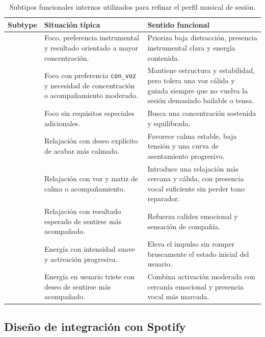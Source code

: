 \begin{table}[H]
\centering
\small
\renewcommand{\arraystretch}{1.12}
\begin{tabularx}{\textwidth}{|P{2.9cm}|P{4.1cm}|Y|}
\hline
\textbf{Subtype} & \textbf{Situación típica} & \textbf{Sentido funcional} \\
\hline
\texttt{} & Foco, preferencia instrumental y resultado orientado a mayor concentración. & Prioriza baja distracción, presencia instrumental clara y energía contenida. \\
\hline
\texttt{} & Foco con preferencia \texttt{con\_voz} y necesidad de concentración o acompañamiento moderado. & Mantiene estructura y estabilidad, pero tolera una voz cálida y guiada siempre que no vuelva la sesión demasiado bailable o tensa. \\
\hline
\texttt{} & Foco sin requisitos especiales adicionales. & Busca una concentración sostenida y equilibrada. \\
\hline
\texttt{} & Relajación con deseo explícito de acabar más calmado. & Favorece calma estable, baja tensión y una curva de asentamiento progresivo. \\
\hline
\texttt{} & Relajación con voz y matiz de calma o acompañamiento. & Introduce una relajación más cercana y cálida, con presencia vocal suficiente sin perder tono reparador. \\
\hline
\texttt{} & Relajación con resultado esperado de sentirse más acompañado. & Refuerza calidez emocional y sensación de compañía. \\
\hline
\texttt{} & Energía con intensidad suave y activación progresiva. & Eleva el impulso sin romper bruscamente el estado inicial del usuario. \\
\hline
\texttt{} & Energía en usuario triste con deseo de sentirse más acompañado. & Combina activación moderada con cercanía emocional y presencia vocal más marcada. \\
\hline
\end{tabularx}
\caption{Subtipos funcionales internos utilizados para refinar el perfil musical de sesión.}
\label{tab:subtipos_funcionales_sesion}
\end{table}

\subsection{Diseño de integración con Spotify}

